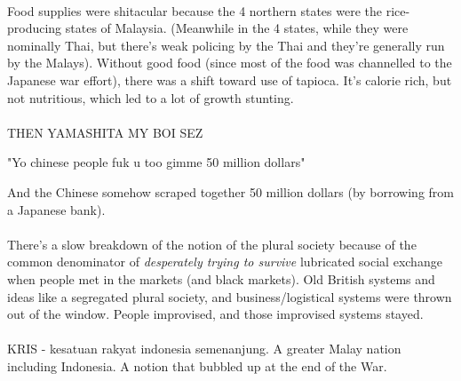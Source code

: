 \documentclass[a4paper]{article}
\begin{document}
\\
Food supplies were shitacular because the 4 northern states were the rice-producing states of Malaysia. (Meanwhile in the 4 states, while they were nominally Thai, but there's weak policing by the Thai and they're generally run by the Malays). Without good food (since most of the food was channelled to the Japanese war effort), there was a shift toward use of tapioca. It's calorie rich, but not nutritious, which led to a lot of growth stunting.\\
\\
THEN YAMASHITA MY BOI SEZ

\begin{displayquote}
	"Yo chinese people fuk u too gimme 50 million dollars"
\end{displayquote}

\noindent And the Chinese somehow scraped together 50 million dollars (by borrowing from a Japanese bank).\\
\\
There's a slow breakdown of the notion of the plural society because of the common denominator of \textit{desperately trying to survive} lubricated social exchange when people met in the markets (and black markets). Old British systems and ideas like a segregated plural society, and business/logistical systems were thrown out of the window. People improvised, and those improvised systems stayed.\\
\\
KRIS - kesatuan rakyat indonesia semenanjung. A greater Malay nation including Indonesia. A notion that bubbled up at the end of the War.
\end{document}
